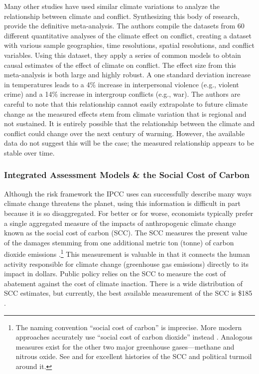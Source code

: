 Many other studies have used similar climate variations to analyze the relationship between climate and conflict. Synthesizing this body of research, \cite{hsiang2013quantifying} provide the definitive meta-analysis. The authors compile the datasets from 60 different quantitative analyses of the climate effect on conflict, creating a dataset with various sample geographies, time resolutions, spatial resolutions, and conflict variables. Using this dataset, they apply a series of common models to obtain causal estimates of the effect of climate on conflict. The effect size from this meta-analysis is both large and highly robust. A one standard deviation increase in temperatures leads to a 4\% increase in interpersonal violence (e.g., violent crime) and a 14\% increase in intergroup conflicts (e.g., war). The authors are careful to note that this relationship cannot easily extrapolate to future climate change as the measured effects stem from climate variation that is regional and not sustained. It is entirely possible that the relationship between the climate and conflict could change over the next century of warming. However, the available data do not suggest this will be the case; the measured relationship appears to be stable over time.



\subsubsection{Integrated Assessment Models \& the Social Cost of Carbon \label{scc_section}}

Although the risk framework the IPCC uses can successfully describe many ways climate change threatens the planet, using this information is difficult in part because it is so disaggregated. For better or for worse, economists typically prefer a single aggregated measure of the impacts of anthropogenic climate change known as the social cost of carbon (SCC). The SCC measures the present value of the damages stemming from one additional metric ton (tonne) of carbon dioxide emissions \citep{scc_explainer}.\footnote{The naming convention ``social cost of carbon'' is imprecise. More modern approaches accurately use ``social cost of carbon dioxide'' instead \cite{rennert2022comprehensive}. Analogous measures exist for the other two major greenhouse gases---methane and nitrous oxide. See \cite{scc_explainer} and \cite{auffhammer2018quantifying} for excellent histories of the SCC and political turmoil around it.} This measurement is valuable in that it connects the human activity responsible for climate change (greenhouse gas emissions) directly to its impact in dollars. Public policy relies on the SCC to measure the cost of abatement against the cost of climate inaction. There is a wide distribution of SCC estimates, but currently, the best available measurement of the SCC is \$185 \citep{rennert2022comprehensive}. 

